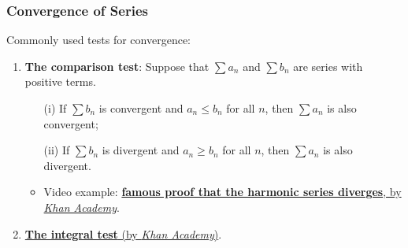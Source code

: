 \documentclass{beamer}
\begin{document}
\begin{frame}
\frametitle{Convergence of Series}
Commonly used tests for convergence:
\begin{enumerate}
\item \textbf{The comparison test}: Suppose that $\sum a_n$ and $\sum b_n$ are series with positive terms. 
\begin{itemize}
\item[(i)] If $\sum b_n$ is convergent and $a_n \leq b_n$ for all $n$, then $\sum a_n$ is also convergent;
\item[(ii)] If $\sum b_n$ is divergent and $a_n \geq b_n$ for all $n$, then $\sum a_n$ is also divergent.
\item Video example: \href{https://youtu.be/4yyLfrsSXQQ}{\textbf{famous proof that the harmonic series diverges}, by \textit{Khan Academy}}.
\end{itemize}
\item \href{https://youtu.be/xRyXz_UZ14Q}{\textbf{The integral test} (by \textit{Khan Academy})}.
\end{enumerate}
\end{frame}
\end{document}
